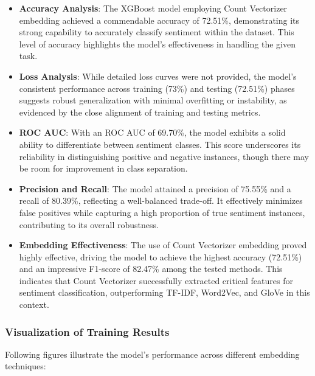 \begin{itemize}
    \item \textbf{Accuracy Analysis}: The XGBoost model employing Count Vectorizer embedding achieved a commendable accuracy of 72.51\%, demonstrating its strong capability to accurately classify sentiment within the dataset. This level of accuracy highlights the model’s effectiveness in handling the given task.
    \item \textbf{Loss Analysis}: While detailed loss curves were not provided, the model’s consistent performance across training (73\%) and testing (72.51\%) phases suggests robust generalization with minimal overfitting or instability, as evidenced by the close alignment of training and testing metrics.
    \item \textbf{ROC AUC}: With an ROC AUC of 69.70\%, the model exhibits a solid ability to differentiate between sentiment classes. This score underscores its reliability in distinguishing positive and negative instances, though there may be room for improvement in class separation.
    \item \textbf{Precision and Recall}: The model attained a precision of 75.55\% and a recall of 80.39\%, reflecting a well-balanced trade-off. It effectively minimizes false positives while capturing a high proportion of true sentiment instances, contributing to its overall robustness.
    \item \textbf{Embedding Effectiveness}: The use of Count Vectorizer embedding proved highly effective, driving the model to achieve the highest accuracy (72.51\%) and an impressive F1-score of 82.47\% among the tested methods. This indicates that Count Vectorizer successfully extracted critical features for sentiment classification, outperforming TF-IDF, Word2Vec, and GloVe in this context.
\end{itemize}

\subsubsection{Visualization of Training Results}

Following figures illustrate the model’s performance across different embedding techniques:

